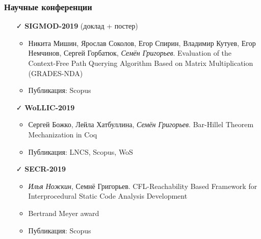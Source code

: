 \documentclass[xcolor=table]{beamer}
\begin{document}
\begin{frame}[fragile]
\frametitle{Научные конференции}
\begin{itemize}

      \item[\faCheck] \textbf{SIGMOD-2019} (доклад + постер)
      \begin{itemize}
        \item Никита Мишин, Ярослав Соколов, Егор Спирин, Владимир Кутуев, Егор Немчинов, Сергей Горбатюк, \emph{Семён Григорьев}. Evaluation of the Context-Free Path Querying Algorithm Based on Matrix Multiplication (GRADES-NDA)
        \item Публикация: Scopus
      \end{itemize}

      \item[\faCheck] \textbf{WoLLIC-2019}
      \begin{itemize}
        \item Сергей Божко, Лейла Хатбуллина, \emph{Семён Григорьев}. Bar-Hillel Theorem Mechanization in Coq
        \item Публикация: LNCS, Scopus, WoS
      \end{itemize}

      \item[\faCheck] \textbf{SECR-2019}
      \begin{itemize}
         \item \emph{Илья Ножкин}, Семнё Григорьев. CFL-Reachability Based Framework for Interprocedural Static Code Analysis Development
         \item Bertrand Meyer award
         \item Публикация: Scopus
      \end{itemize}

    \end{itemize}
    \end{frame}
\end{document}
